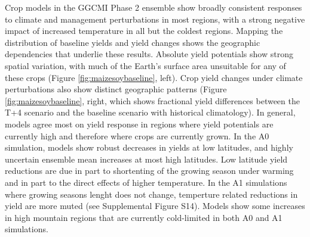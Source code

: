\documentclass[gmd, manuscript]{copernicus} %
\begin{document}
Crop models in the GGCMI Phase 2 ensemble show broadly consistent responses to climate and management perturbations in most regions, with a strong negative impact of increased temperature in all but the coldest regions. 
Mapping the distribution of baseline yields and yield changes shows the geographic dependencies that underlie these results. 
Absolute yield potentials show strong spatial variation, with much of the Earth's surface area unsuitable for any of these crops (Figure \ref{fig:maizesoybaseline}, left).
Crop yield changes under climate perturbations also show distinct geographic patterns (Figure \ref{fig:maizesoybaseline}, right, which shows fractional yield differences between the T+4 scenario and the baseline scenario with historical climatology).
In general, models agree most on yield response in regions where yield potentials are currently high and therefore where crops are currently grown. 
In the A0 simulation, models show robust decreases in yields at low latitudes, and highly uncertain ensemble mean increases at most high latitudes.
Low latitude yield reductions are due in part to shortenting of the growing season under warming and in part to the direct effects of higher temperature.
In the A1 simulations where growing seasons lenght does not change, temperture related reductions in yield are more muted (see Supplemental Figure S14).
Models show some increases in high mountain regions that are currently cold-limited in both A0 and A1 simulations.
\end{document}

